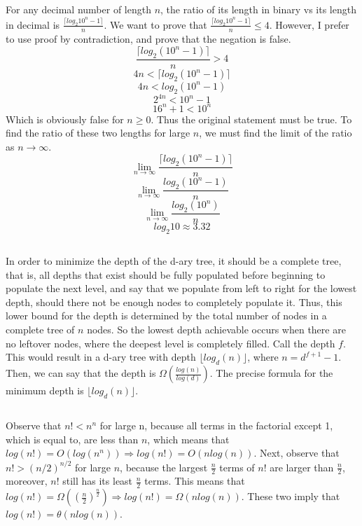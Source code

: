 \documentclass{article}
\newcommand\floor[1]{\lfloor#1\rfloor}
\newcommand\ceil[1]{\lceil#1\rceil}
\begin{document}
\subsection{} For any decimal number of length $n$, the ratio of its length in binary vs its length in decimal is $\frac{\ceil{log_2{10^n-1}}}{n}$. We want to prove that $\frac{\ceil{log_2{10^n-1}}}{n} \leq 4$. However, I prefer to use proof by contradiction, and prove that the negation is false. $$\frac{\ceil{log_2{(10^n-1)}}}{n} > 4$$
$$4n<\ceil{log_2{(10^n-1)}}$$
$$4n<log_2{(10^n-1)}$$
$$2^{4n}<10^n-1$$
$$16^n+1<10^n$$
Which is obviously false for $n \geq 0$. Thus the original statement must be true. 
To find the ratio of these two lengths for large $n$, we must find the limit of the ratio as $n \rightarrow \infty$.
$$\lim_{n \rightarrow \infty}\frac{\ceil{log_2{(10^n-1)}}}{n}$$
$$\lim_{n \rightarrow \infty}\frac{log_2{(10^n-1)}}{n}$$
$$\lim_{n \rightarrow \infty}\frac{log_2{(10^n)}}{n}$$
$$log_2{10} \approx 3.32$$
\subsection{}In order to minimize the depth of the d-ary tree, it should be a complete tree, that is, all depths that exist should be fully populated before beginning to populate the next level, and say that we populate from left to right for the lowest depth, should there not be enough nodes to completely populate it. Thus, this lower bound for the depth is determined by the total number of nodes in a complete tree of $n$ nodes. So the lowest depth achievable occurs when there are no leftover nodes, where the deepest level is completely filled. Call the depth $f$. This would result in a d-ary tree with depth $\floor{log_d(n)}$, where $n=d^{f+1}-1$. Then, we can say that the depth is $\Omega(\frac{log(n)}{log(d)})$. The precise formula for the minimum depth is $\floor{log_d(n)}$.
\subsection{} Observe that $n!<n^n$ for large n, because all terms in the factorial except 1, which is equal to, are less than $n$, which means that $log(n!)=O(log(n^n)) \Rightarrow log(n!)=O(nlog(n))$. Next, observe that $n! > (n/2)^{n/2}$ for large $n$, because the largest $\frac{n}{2}$ terms of $n!$ are larger than $\frac{n}{2}$, moreover, $n!$ still has its least $\frac{n}{2}$ terms. This means that $log(n!)=\Omega((\frac{n}{2})^{\frac{n}{2}}) \Rightarrow log(n!)=\Omega(nlog(n))$. These two imply that $log(n!)=\theta(nlog(n))$. 
\end{document}

